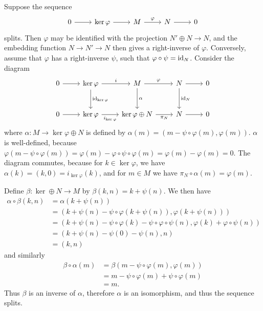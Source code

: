 \begin{solution}
	Suppose the sequence
	\[
		\begin{tikzcd}
			0
			\arrow[r]
			& \ker \varphi
			\arrow[r]
			& M
			\arrow[r, "\varphi"]
			& N
			\arrow[r]
			& 0
		\end{tikzcd}
	\]
	splits. Then $\varphi$ may be identified with the projection $N' \oplus N \to N$, and the embedding function $N \to N' \to N$ then gives a right-inverse of $\varphi$. Conversely, assume that $\varphi$ has a right-inverse $\psi$, such that $\varphi \circ \psi = \mathrm{id}_N$. Consider the diagram
	\[
		\begin{tikzcd}[row sep=large]
			0
			\arrow[r]
			& \ker \varphi
			\arrow[r, "i"]
			\arrow[d, "\id_{\ker \varphi}"]
			& M
			\arrow[r, "\varphi"]
			\arrow[d, "\alpha"]
			& N
			\arrow[r]
			\arrow[d, "\id_N"]
			& 0 \\
			0
			\arrow[r]
			& \ker \varphi
			\arrow[r, "i_{\ker \varphi}"']
			& \ker \varphi \oplus N
			\arrow[r, "\pi_N"']
			& N
			\arrow[r]
			& 0
		\end{tikzcd}
	\]
	where $\alpha: M \to \ker \varphi \oplus N$ is defined by $\alpha(m) = (m - \psi \circ \varphi(m), \varphi(m))$. $\alpha$ is well-defined, because $\varphi(m - \psi \circ \varphi(m)) = \varphi(m) - \varphi \circ \psi \circ \varphi(m) = \varphi(m) - \varphi(m) = 0$. The diagram commutes, because for $k \in \ker \varphi$, we have $\alpha(k) = (k, 0) = i_{\ker \varphi}(k)$, and for $m \in M$ we have $\pi_N \circ \alpha(m) = \varphi(m)$.
	
	Define $\beta: \ker \oplus N \to M$ by $\beta(k, n) = k + \psi(n)$. We then have
	\begin{align*}
		\alpha \circ \beta(k, n) &= \alpha(k + \psi(n)) \\
		&= (k + \psi(n) - \psi \circ \varphi(k + \psi(n)), \varphi(k + \psi(n))) \\
		&= (k + \psi(n) - \psi \circ \varphi(k) - \psi \circ \varphi \circ \psi(n), \varphi(k) + \varphi \circ \psi(n)) \\
		&= (k + \psi(n) - \psi(0) - \psi(n), n) \\
		&= (k, n)
	\end{align*}
	and similarly
	\begin{align*}
		\beta \circ \alpha (m) &= \beta(m - \psi \circ \varphi(m), \varphi(m)) \\
		&= m - \psi \circ \varphi(m) + \psi \circ \varphi(m) \\
		&= m \text{.}
	\end{align*}
	Thus $\beta$ is an inverse of $\alpha$, therefore $\alpha$ is an isomorphism, and thus the sequence splits.
\end{solution}

